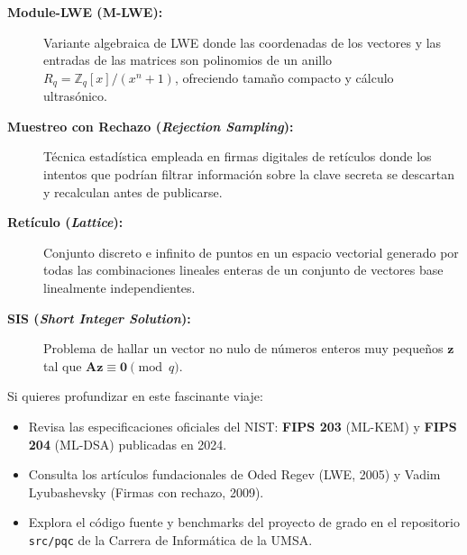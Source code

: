 \begin{description}
  \item[\textbf{Module-LWE (M-LWE):}] Variante algebraica de LWE donde las coordenadas de los vectores y las entradas de las matrices son polinomios de un anillo $R_q = \mathbb{Z}_q[x]/(x^n+1)$, ofreciendo tamaño compacto y cálculo ultrasónico.
  
  \item[\textbf{Muestreo con Rechazo (\textit{Rejection Sampling}):}] Técnica estadística empleada en firmas digitales de retículos donde los intentos que podrían filtrar información sobre la clave secreta se descartan y recalculan antes de publicarse.
  
  \item[\textbf{Retículo (\textit{Lattice}):}] Conjunto discreto e infinito de puntos en un espacio vectorial generado por todas las combinaciones lineales enteras de un conjunto de vectores base linealmente independientes.
  
  \item[\textbf{SIS (\textit{Short Integer Solution}):}] Problema de hallar un vector no nulo de números enteros muy pequeños $\mathbf{z}$ tal que $\mathbf{A}\mathbf{z} \equiv \mathbf{0} \pmod q$.
\end{description}

\vspace{0.8cm}
\begin{tcolorbox}[colback=BoxBgBlue, colframe=PQCMainBlue, arc=2mm, title={\sffamily\bfseries Para Seguir Aprendiendo}]
\sffamily\small
Si quieres profundizar en este fascinante viaje:
\begin{itemize}
  \item Revisa las especificaciones oficiales del NIST: \textbf{FIPS 203} (ML-KEM) y \textbf{FIPS 204} (ML-DSA) publicadas en 2024.
  \item Consulta los artículos fundacionales de Oded Regev (LWE, 2005) y Vadim Lyubashevsky (Firmas con rechazo, 2009).
  \item Explora el código fuente y benchmarks del proyecto de grado en el repositorio \texttt{src/pqc} de la Carrera de Informática de la UMSA.
\end{itemize}
\end{tcolorbox}
